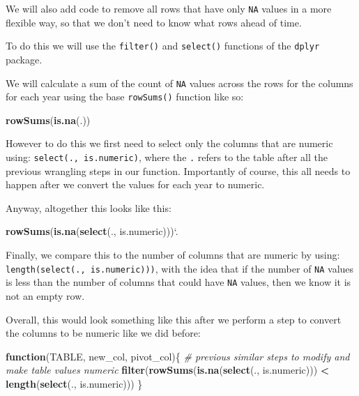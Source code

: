 \documentclass[
]{article}
\newenvironment{Shaded}{\begin{snugshade}}{\end{snugshade}}
\newcommand{\CommentTok}[1]{\textcolor[rgb]{0.56,0.35,0.01}{\textit{#1}}}
\newcommand{\ControlFlowTok}[1]{\textcolor[rgb]{0.13,0.29,0.53}{\textbf{#1}}}
\newcommand{\DataTypeTok}[1]{\textcolor[rgb]{0.13,0.29,0.53}{#1}}
\newcommand{\KeywordTok}[1]{\textcolor[rgb]{0.13,0.29,0.53}{\textbf{#1}}}
\newcommand{\NormalTok}[1]{#1}
\newcommand{\OperatorTok}[1]{\textcolor[rgb]{0.81,0.36,0.00}{\textbf{#1}}}
\newcommand{\StringTok}[1]{\textcolor[rgb]{0.31,0.60,0.02}{#1}}
\begin{document}
We will also add code to remove all rows that have only \texttt{NA}
values in a more flexible way, so that we don't need to know what rows
ahead of time.

To do this we will use the \texttt{filter()} and \texttt{select()}
functions of the \texttt{dplyr} package.

We will calculate a sum of the count of \texttt{NA} values across the
rows for the columns for each year using the base \texttt{rowSums()}
function like so:

\begin{Shaded}
\begin{Highlighting}[]
\KeywordTok{rowSums}\NormalTok{(}\KeywordTok{is.na}\NormalTok{(.))}
\end{Highlighting}
\end{Shaded}

However to do this we first need to select only the columns that are
numeric using: \texttt{select(.,\ is.numeric)}, where the \texttt{.}
refers to the table after all the previous wrangling steps in our
function. Importantly of course, this all needs to happen after we
convert the values for each year to numeric.

Anyway, altogether this looks like this:

\begin{Shaded}
\begin{Highlighting}[]
\KeywordTok{rowSums}\NormalTok{(}\KeywordTok{is.na}\NormalTok{(}\KeywordTok{select}\NormalTok{(., is.numeric)))}\StringTok{`}\DataTypeTok{.}
\end{Highlighting}
\end{Shaded}

Finally, we compare this to the number of columns that are numeric by
using: \texttt{length(select(.,\ is.numeric)))}, with the idea that if
the number of \texttt{NA} values is less than the number of columns that
could have \texttt{NA} values, then we know it is not an empty row.

Overall, this would look something like this after we perform a step to
convert the columns to be numeric like we did before:

\begin{Shaded}
\begin{Highlighting}[]
\ControlFlowTok{function}\NormalTok{(TABLE, new_col, pivot_col)\{}
  \CommentTok{# previous similar steps to modify and make table values numeric}
    \KeywordTok{filter}\NormalTok{(}\KeywordTok{rowSums}\NormalTok{(}\KeywordTok{is.na}\NormalTok{(}\KeywordTok{select}\NormalTok{(., is.numeric))) }\OperatorTok{<}\StringTok{ }
\StringTok{             }\KeywordTok{length}\NormalTok{(}\KeywordTok{select}\NormalTok{(., is.numeric))) }
\NormalTok{  \}}
\end{Highlighting}
\end{Shaded}
\end{document}
